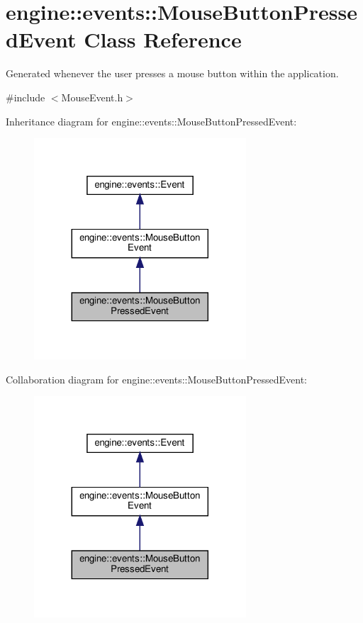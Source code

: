 \hypertarget{classengine_1_1events_1_1MouseButtonPressedEvent}{}\section{engine\+:\+:events\+:\+:Mouse\+Button\+Pressed\+Event Class Reference}
\label{classengine_1_1events_1_1MouseButtonPressedEvent}


Generated whenever the user presses a mouse button within the application.  




{\ttfamily \#include $<$Mouse\+Event.\+h$>$}



Inheritance diagram for engine\+:\+:events\+:\+:Mouse\+Button\+Pressed\+Event\+:\nopagebreak
\begin{figure}[H]
\begin{center}
\leavevmode
\includegraphics[width=224pt]{classengine_1_1events_1_1MouseButtonPressedEvent__inherit__graph}
\end{center}
\end{figure}


Collaboration diagram for engine\+:\+:events\+:\+:Mouse\+Button\+Pressed\+Event\+:\nopagebreak
\begin{figure}[H]
\begin{center}
\leavevmode
\includegraphics[width=224pt]{classengine_1_1events_1_1MouseButtonPressedEvent__coll__graph}
\end{center}
\end{figure}
